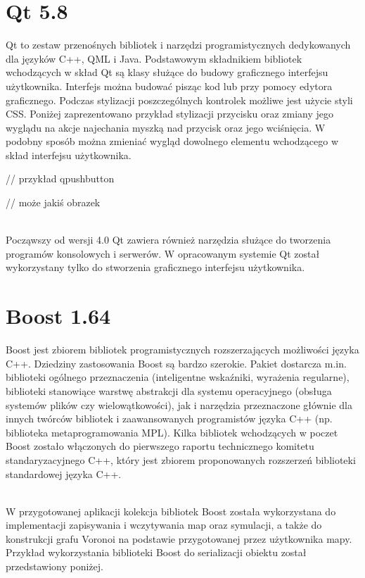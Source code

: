 \documentclass[a4paper,11pt,twoside]{report}
\theoremstyle{definition}
\begin{document}
\section{Qt 5.8}

Qt to zestaw przenośnych bibliotek i narzędzi programistycznych dedykowanych dla języków C++, QML i Java. Podstawowym składnikiem bibliotek wchodzących w skład Qt są klasy służące do budowy graficznego interfejsu użytkownika. Interfejs można budować pisząc kod lub przy pomocy edytora graficznego. Podczas stylizacji poszczególnych kontrolek możliwe jest użycie styli CSS. Poniżej zaprezentowano przykład stylizacji przycisku oraz zmiany jego wyglądu na akcje najechania myszką nad przycisk oraz jego wciśnięcia. W podobny sposób można zmieniać wygląd dowolnego elementu wchodzącego w skład interfejsu użytkownika.

// przykład qpushbutton

// może jakiś obrazek

~\\Począwszy od wersji 4.0 Qt zawiera również narzędzia służące do tworzenia programów konsolowych i serwerów. W opracowanym systemie Qt został wykorzystany tylko do stworzenia graficznego interfejsu użytkownika.


\section{Boost 1.64}

Boost jest zbiorem bibliotek programistycznych rozszerzających możliwości języka C++. Dziedziny zastosowania Boost są bardzo szerokie. Pakiet dostarcza m.in. biblioteki ogólnego przeznaczenia (inteligentne wskaźniki, wyrażenia regularne), biblioteki stanowiące warstwę abstrakcji dla systemu operacyjnego (obsługa systemów plików czy wielowątkowości), jak i narzędzia przeznaczone głównie dla innych twórców bibliotek i zaawansowanych programistów języka C++ (np. biblioteka metaprogramowania MPL). Kilka bibliotek wchodzących w poczet Boost zostało włączonych do pierwszego raportu technicznego komitetu standaryzacyjnego C++, który jest zbiorem proponowanych rozszerzeń biblioteki standardowej języka C++. 

~\\W przygotowanej aplikacji kolekcja bibliotek Boost została wykorzystana do implementacji zapisywania i wczytywania map oraz symulacji, a także do konstrukcji grafu Voronoi na podstawie przygotowanej przez użytkownika mapy.  Przykład wykorzystania biblioteki Boost do serializacji obiektu został przedstawiony poniżej.
\end{document}
